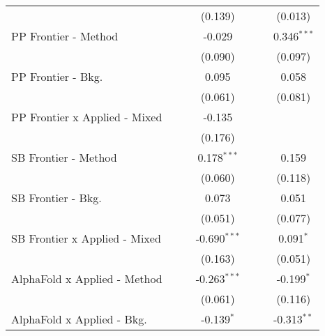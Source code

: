 \begin{tabular}{lcccccc}
                                  &                &                & (0.139)        &                &               & (0.013)\\   
   PP Frontier - Method           &                &                & -0.029         &                &               & 0.346$^{***}$\\   
                                  &                &                & (0.090)        &                &               & (0.097)\\   
   PP Frontier - Bkg.             &                &                & 0.095          &                &               & 0.058\\   
                                  &                &                & (0.061)        &                &               & (0.081)\\   
   PP Frontier x Applied - Mixed  &                &                & -0.135         &                &               &   \\   
                                  &                &                & (0.176)        &                &               &   \\   
   SB Frontier - Method           &                &                & 0.178$^{***}$  &                &               & 0.159\\   
                                  &                &                & (0.060)        &                &               & (0.118)\\   
   SB Frontier - Bkg.             &                &                & 0.073          &                &               & 0.051\\   
                                  &                &                & (0.051)        &                &               & (0.077)\\   
   SB Frontier x Applied - Mixed  &                &                & -0.690$^{***}$ &                &               & 0.091$^{*}$\\   
                                  &                &                & (0.163)        &                &               & (0.051)\\   
   AlphaFold x Applied - Method   &                &                & -0.263$^{***}$ &                &               & -0.199$^{*}$\\   
                                  &                &                & (0.061)        &                &               & (0.116)\\   
   AlphaFold x Applied - Bkg.     &                &                & -0.139$^{*}$   &                &               & -0.313$^{**}$\\   

\end{tabular}
